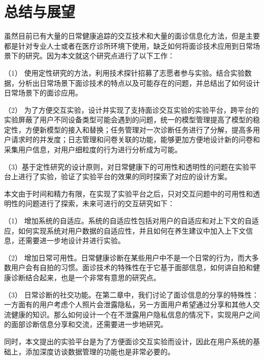 \chapter{总结与展望}
虽然目前已有大量的日常健康追踪的交互技术和大量的面诊信息化方法，但是主要都是针对专业人士或者在医疗诊所环境下使用，缺乏如何将面诊技术应用到日常场景下的研究。因为本文就这个研究点进行了以下工作：

（1） 使用定性研究的方法，利用技术探针招募了志愿者参与实验。结合实验数据，分析出日常场景下面诊技术的特点以及可能存在的问题，并总结出了如何设计日常场景下的面诊应用。

（2） 为了方便交互实验，设计并实现了支持面诊交互实验的实验平台，跨平台的实验屏蔽了用户不同设备类型可能会遇到的问题，统一的模型管理提高了模型的稳定性，方便新模型的接入和替换；任务管理对一次诊断任务进行了分解，提高多用户请求时的并发度；日志管理和问卷关联的功能，能够更加方便地设计新的问卷和采集用户信息，对用户细粒度的行为进行分析成为可能。

（3）基于定性研究的设计原则，对日常健康下的可用性和透明性的问题在实验平台上进行了实验，验证了实验平台的效果的同时探索了对应的设计方案。




本文由于时间和精力有限，在实现了实验平台之后，只对交互问题中的可用性和透明性的问题进行了探索，未来可进行的交互研究如下：

（1） 增加系统的自适应。系统的自适应性包括对用户的自适应和对上下文的自适应，如何实现系统对用户数据的自适应性，并且如何在养生建议中加入上下文信息，还需要进一步地设计并进行实验。

（2） 增加日常可用性。日常健康诊断在某些用户中不是一个日常的行为，而大多数用户会有自拍的习惯。面诊技术的特殊性在于它基于面部信息，如何讲自拍和健康诊断结合起来，也是一个非常有意思的研究点。

（3） 日常诊断的社交功能。在第二章中，我们讨论了面诊信息的分享的特殊性：一方面有的用户考虑个人照片会泄露隐私，另一方面用户希望通过分享和其他人交流健康的知识。那么如何设计一个在不泄露用户隐私信息的情况下，实现用户之间的面部诊断信息分享和交流，还需要进一步地研究。

同时，本文提出的实验平台是为了方便面诊交互实验而设计，因此在用户系统的基础上，添加深度访谈数据管理的功能也是非常必要的。